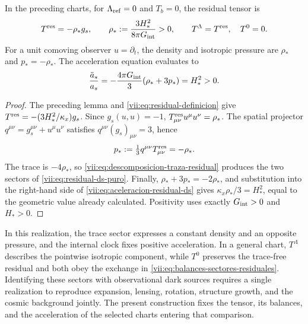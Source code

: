\begin{theorem}
\label{vii:thm:residual-ds-aceleracion}
In the preceding charts, for \(\Lambda_{\rm ref}=0\) and \(T_b=0\),
the residual tensor is
\begin{equation}
 T^{\rm res}=-\rho_*g_s,\qquad
 \rho_*:=\frac{3H_*^2}{8\pi G_{\rm int}}>0,
 \qquad T^\Lambda=T^{\rm res},\quad T^0=0.
 \label{vii:eq:residual-ds-puro}
\end{equation}
For a unit comoving observer \(u=\partial_t\), the density
and isotropic pressure are \(\rho_*\) and \(p_*=-\rho_*\).
The acceleration equation evaluates to
\begin{equation}
 \frac{\ddot a_s}{a_s}
 =-\frac{4\pi G_{\rm int}}3(\rho_*+3p_*)=H_*^2>0.
 \label{vii:eq:aceleracion-residual-ds}
\end{equation}
\end{theorem}
\begin{proof}
The preceding lemma and \eqref{vii:eq:residual-definicion} give
\(T^{\rm res}=-(3H_*^2/\kappa_x)g_s\).
Since \(g_s(u,u)=-1\),
\(T^{\rm res}_{\mu\nu}u^\mu u^\nu=\rho_*\).
The spatial projector \(q^{\mu\nu}=g_s^{\mu\nu}+u^\mu u^\nu\)
satisfies \(q^{\mu\nu}(g_s)_{\mu\nu}=3\), hence
\[
 p_*:=\tfrac13q^{\mu\nu}T^{\rm res}_{\mu\nu}=-\rho_*.
\]
The trace is \(-4\rho_*\), so
\eqref{vii:eq:descomposicion-traza-residual} produces the two sectors
of \eqref{vii:eq:residual-ds-puro}. Finally,
\(\rho_*+3p_*=-2\rho_*\), and substitution into the right-hand side
of \eqref{vii:eq:aceleracion-residual-ds} gives
\(\kappa_x\rho_*/3=H_*^2\), equal to the geometric value already calculated.
Positivity uses exactly \(G_{\rm int}>0\) and \(H_*>0\).
\end{proof}

In this realization, the trace sector expresses a constant density
and an opposite pressure, and the internal clock fixes positive acceleration.
In a general chart, \(T^\Lambda\) describes the pointwise isotropic
component, while \(T^0\) preserves the trace-free residual and both
obey the exchange in \eqref{vii:eq:balances-sectores-residuales}.
Identifying these sectors with observational dark sources requires
a single realization to reproduce expansion, lensing, rotation,
structure growth, and the cosmic background jointly. The present
construction fixes the tensor, its balances, and the acceleration of
the selected charts entering that comparison.
